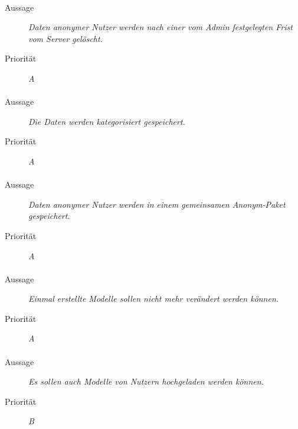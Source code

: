 \paragraph{}
\begin{description}
\item[Aussage] \textit{Daten anonymer Nutzer werden nach einer vom Admin festgelegten Frist vom Server gelöscht.}
\item[Priorität] \textit{A}
\end{description}

\paragraph{}
\begin{description}
\item[Aussage] \textit{Die Daten werden kategorisiert gespeichert.}
\item[Priorität] \textit{A}
\end{description}


\paragraph{}
\begin{description}
\item[Aussage] \textit{Daten anonymer Nutzer werden in einem gemeinsamen Anonym-Paket gespeichert.}
\item[Priorität] \textit{A}
\end{description}

\paragraph{}
\begin{description}
\item[Aussage] \textit{Einmal erstellte Modelle sollen nicht mehr verändert werden können.}
\item[Priorität] \textit{A}
\end{description}

\paragraph{}
\begin{description}
\item[Aussage] \textit{Es sollen auch Modelle von Nutzern hochgeladen werden können.}
\item[Priorität] \textit{B}
\end{description}

